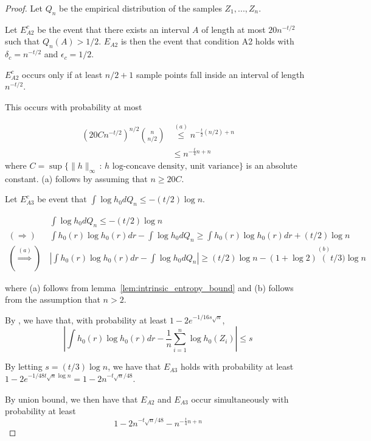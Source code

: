 \documentclass[12pt]{article}
\begin{document}
\begin{proof}

  Let $Q_n$ be the empirical distribution of the samples $Z_1,...,Z_n$.
  
  Let $E_{A2}^c$ be the event that there exists an interval $A$ of length at most $20 n^{-t/2}$ such that $Q_n(A) > 1/2$. $E_{A2}$ is then the event that condition A2 holds with $\delta_c = n^{-t/2}$ and $\epsilon_c = 1/2$.

  $E_{A2}^c$ occurs only if at least $n/2 + 1$ sample points fall inside an interval of length $n^{-t/2}$.

  This occurs with probability at most

  \begin{align*}
    (20 C n^{-t/2} )^{n/2 } {n \choose n/2} & \stackrel{(a)} \leq
     n^{- \frac{t}{2} (n/2) + n} \\
    &\leq n^{- \frac{t}{4} n + n}
  \end{align*}
  where $C = \sup \{ \| h\|_\infty \,:\, h \textrm{ log-concave density, unit variance} \}$ is an absolute constant. (a) follows by assuming that $n \geq 20 C$.


  Let $E_{A3}^c$ be event that
  $\int \log h_0 dQ_n \leq -(t/2) \log n$.

  \begin{align*}
    &\int \log h_0 dQ_n \leq -(t/2) \log n \\
    (\Rightarrow)\,
  & \int h_0(r) \log h_0(r) dr - \int \log h_0 dQ_n 
    \geq  \int h_0(r) \log h_0(r) dr + (t/2) \log n \\
   ( \stackrel{(a)} \Rightarrow)\,
    & \left| \int h_0(r) \log h_0(r) dr - \int \log h_0 dQ_n
      \right|
      \geq (t/2) \log n - (1 + \log 2)
      \stackrel{(b)} (t/3) \log n
  \end{align*}

  where (a) follows from lemma~\ref{lem:intrinsic_entropy_bound} and (b) follows from the assumption that $n > 2$.
  
  By \cite[][Theorem~1.1]{bobkov2011concentration}, we have that, with probability at least $1 - 2e^{-1/16 s \sqrt{n}}$,
  \[
    \left| \int h_0(r) \log h_0(r) dr - \frac{1}{n} \sum_{i=1}^n \log h_0(Z_i) \right| \leq s
  \]

  By letting  $s = (t/3) \log n$, we have that $E_{A3}$ holds with probability at least $1 -  2e^{-1/48 t \sqrt{n}\log n} = 1 - 2 n^{-t \sqrt{n} / 48}$.
    
  By union bound, we then have that $E_{A2}$ and $E_{A3}$ occur simultaneously with probability at least
  \[
    1 - 2n^{-t \sqrt{n}/48} - n^{- \frac{t}{4} n + n}
  \]


\end{proof}
\end{document}
